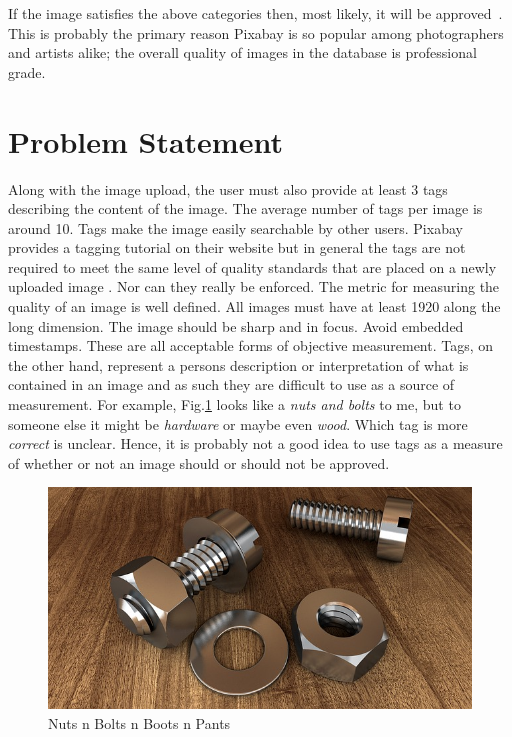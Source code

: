 \documentclass[10pt, a4paper, twocolumn]{article} %
\begin{document}
If the image satisfies the above categories then, most likely, it will be approved~\cite{Pixabay:Tagging}.  This is probably the primary reason Pixabay is so popular among photographers and artists alike; the overall quality of images in the database is professional grade.

\section{Problem Statement} %

Along with the image upload, the user must also provide at least 3 tags describing the content of the image.  The average number of tags per image is around 10.  Tags make the image easily searchable by other users.  Pixabay provides a tagging tutorial on their website but in general the tags are not required to meet the same level of quality standards that are placed on a newly uploaded image \citep{Pixabay:ImgStandards}. Nor can they really be enforced.  The metric for measuring the quality of an image is well defined.  All images must have at least 1920 along the long dimension.  The image should be sharp and in focus.  Avoid embedded timestamps.  These are all acceptable forms of objective measurement.  Tags, on the other hand, represent a persons description or interpretation of what is contained in an image and as such they are difficult to use as a source of measurement.  For example, Fig.\ref{screw-1924174_640} looks like a \textit{nuts and bolts} to me, but to someone else it might be \textit{hardware} or maybe even \textit{wood}.  Which tag is more \textit{correct} is unclear.  Hence, it is probably not a good idea to use tags as a measure of whether or not an image should or should not be approved. 

\begin{figure}
	\includegraphics[width=\linewidth]{screw-1924174_640.jpg} %
	\caption{Nuts n Bolts n Boots n Pants} %
	\label{screw-1924174_640} %
\end{figure}
\end{document}
